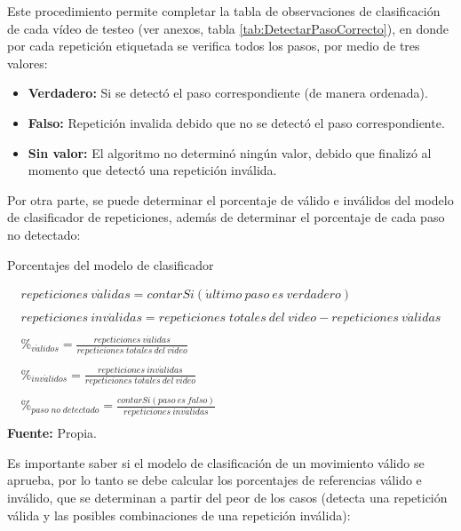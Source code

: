Este procedimiento permite completar la tabla de observaciones de clasificaci\'on de cada v\'ideo de testeo (ver anexos, tabla \ref{tab:DetectarPasoCorrecto}), en donde por cada repetici\'on etiquetada se verifica todos los pasos, por medio de tres valores:
\begin{itemize}
\item \textbf{Verdadero:} Si se detect\'o el paso correspondiente (de manera ordenada).
\item \textbf{Falso:} Repetici\'on invalida debido que no se detect\'o el paso correspondiente. 
\item \textbf{Sin valor:} El algoritmo no determin\'o ning\'un valor, debido que finaliz\'o al momento  que detect\'o una repetici\'on inv\'alida.
\end{itemize}
Por otra parte, se puede determinar el porcentaje de v\'alido e inv\'alidos del modelo de clasificador de repeticiones, adem\'as de determinar el porcentaje de cada paso no detectado:
\begin{formula}[H]
	\centering
	\caption{Porcentajes del modelo de clasificador}
	\label{frm:porcentajeClasificador}
	\begin{equation}
\begin{matrix}
repeticiones\: v\acute{a}lidas = contarSi(\acute{u}ltimo\: paso\: es\: verdadero) \\ 
 \\ 
repeticiones\: inv\acute{a}lidas = repeticiones\; totales\: del\: video - repeticiones\: v\acute{a}lidas\\ 
 \\ 
\%_{v\acute{a}lidos}=\frac{repeticiones\: v\acute{a}lidas}{repeticiones\; totales\: del\: video}\\ 
\\
\%_{inv\acute{a}lidos}=\frac{repeticiones\: inv\acute{a}lidas}{repeticiones\; totales\: del\: video}\\ 
\\ 
\%_{paso\; no\; detectado}=\frac{contarSi(paso\: es\: falso)}{repeticiones\: inv\acute{a}lidas}\\ 
\end{matrix}
	\end{equation}
	\textbf{Fuente:} Propia.
\end{formula}
Es importante saber si el modelo de clasificaci\'on  de un movimiento v\'alido se aprueba, por lo tanto se debe calcular los porcentajes de referencias v\'alido e inv\'alido, que se determinan a partir del peor de los casos (detecta una repetici\'on v\'alida y las posibles combinaciones de una  repetici\'on inv\'alida): 

